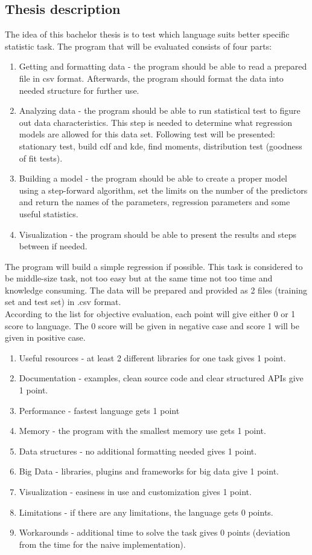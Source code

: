 \documentclass{article}
\begin{document}
\subsection{Thesis description}
The idea of this bachelor thesis is to test which language suits better specific statistic task. 
The program that will be evaluated consists of four parts:
\begin{enumerate}
    \item Getting and formatting data - the program should be able to read a prepared file in csv format. Afterwards, the program should format the data into needed structure for further use.
    \item Analyzing data - the program should be able to run statistical test to figure out data characteristics. This step is needed to determine what regression models are allowed for this data set. Following test will be presented: stationary test, build cdf and kde, find moments, distribution test (goodness of fit tests).
    \item Building a model - the program should be able to create a proper model using a step-forward algorithm, set the limits on the number of the predictors and return the names of the parameters, regression parameters and some useful statistics.
    \item Visualization - the program should be able to present the results and steps between if needed.
\end{enumerate}
The program will build a simple regression if possible. This task is considered to be middle-size task, not too easy but at the same time not too time and knowledge consuming.
The data will be prepared and provided as 2 files (training set and test set) in .csv format.\\
According to the list for objective evaluation, each point will give either 0 or 1 score to language. The 0 score will be given in negative case and score 1 will be given in positive case.
\begin{enumerate}
    \item[] Useful resources - at least 2 different libraries for one task gives 1 point.
    \item[] Documentation - examples, clean source code and clear structured APIs give 1 point.
    \item[] Performance - fastest language gets 1 point
    \item[] Memory - the program with the smallest memory use gets 1 point.
    \item[] Data structures - no additional formatting needed gives 1 point.
    \item[] Big Data - libraries, plugins and frameworks for big data give 1 point.
    \item[] Visualization - easiness in use and customization gives 1 point.
    \item[] Limitations - if there are any limitations, the language gets 0 points.
    \item[] Workarounds - additional time to solve the task gives 0 points (deviation from the time for the naive implementation).
\end{enumerate}
\end{document}
